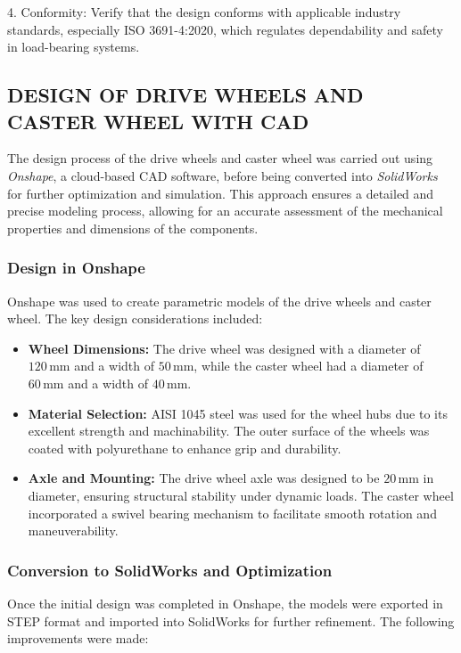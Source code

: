 \documentclass[../../main]{subfiles}
\begin{document}
4. Conformity: Verify that the design conforms with applicable industry
standards, especially ISO 3691-4:2020, which regulates dependability and
safety in load-bearing systems.

\subsection{DESIGN OF DRIVE WHEELS AND CASTER WHEEL  WITH  CAD}
The design process of the drive wheels and caster wheel was carried out using \emph{Onshape}, a cloud-based CAD software, before being converted into \emph{SolidWorks} for further optimization and simulation. This approach ensures a detailed and precise modeling process, allowing for an accurate assessment of the mechanical properties and dimensions of the components.

\subsubsection{Design in Onshape}
Onshape was used to create parametric models of the drive wheels and caster wheel. The key design considerations included:
\begin{itemize}

\item \textbf{Wheel Dimensions:} The drive wheel was designed with a diameter of $120 \, \mathrm{mm}$ and a width of $50 \, \mathrm{mm}$, while the caster wheel had a diameter of $60 \, \mathrm{mm}$ and a width of $40 \, \mathrm{mm}$.
  
\item \textbf{Material Selection:} AISI 1045 steel was used for the wheel hubs due to its excellent strength and machinability. The outer surface of the wheels was coated with polyurethane to enhance grip and durability.
  
\item \textbf{Axle and Mounting:} The drive wheel axle was designed to be $20 \, \mathrm{mm}$ in diameter, ensuring structural stability under dynamic loads. The caster wheel incorporated a swivel bearing mechanism to facilitate smooth rotation and maneuverability.
  
\end{itemize}

\subsubsection{Conversion to SolidWorks and Optimization}
Once the initial design was completed in Onshape, the models were exported in STEP format and imported into SolidWorks for further refinement. The following improvements were made:
\end{document}
